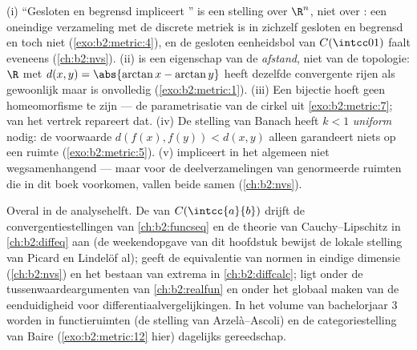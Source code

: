 \begin{remark}\label{rem:b2:metric:pitfalls}
(i) ``Gesloten en begrensd impliceert '' is een stelling
over $\R^n$, niet over : een oneindige verzameling
met de discrete metriek is in zichzelf gesloten en begrensd en toch
niet  (\cref{exo:b2:metric:4}), en de gesloten
eenheidsbol van $C(\intcc01)$ faalt eveneens (\cref{ch:b2:nvs}).
(ii)  is een eigenschap van de \emph{afstand}, niet van
de topologie: $\R$ met $d(x,y) = \abs{\arctan x - \arctan y}$ heeft
dezelfde convergente rijen als gewoonlijk maar is onvolledig
(\cref{exo:b2:metric:1}). (iii) Een  bijectie hoeft geen
homeomorfisme te zijn --- de parametrisatie van de cirkel uit
\cref{exo:b2:metric:7};  van het vertrek repareert dat.
(iv) De stelling van Banach heeft $k < 1$ \emph{uniform} nodig: de
voorwaarde $d(f(x), f(y)) < d(x,y)$ alleen garandeert niets op een
 ruimte (\cref{exo:b2:metric:5}). (v) 
impliceert in het algemeen niet wegsamenhangend --- maar voor de
 deelverzamelingen van genormeerde ruimten die in dit boek
voorkomen, vallen beide samen (\cref{ch:b2:nvs}).
\end{remark}

\begin{remark}
Overal in de analysehelft. De  van $C(\intcc{a}{b})$
drijft de convergentiestellingen van \cref{ch:b2:funcseq} en de
theorie van Cauchy--Lipschitz in \cref{ch:b2:diffeq} aan (de
weekendopgave van dit hoofdstuk bewijst de lokale stelling van
Picard en Lindelöf al);  geeft de equivalentie van
normen in eindige dimensie (\cref{ch:b2:nvs}) en het bestaan van
extrema in \cref{ch:b2:diffcalc};  ligt onder de
tussenwaardeargumenten van \cref{ch:b2:realfun} en onder het
globaal maken van de eenduidigheid voor
differentiaalvergelijkingen. In het volume van bachelorjaar 3
worden  in functieruimten (de stelling van
Arzelà--Ascoli) en de categoriestelling van Baire
(\cref{exo:b2:metric:12} hier) dagelijks gereedschap.
\end{remark}

